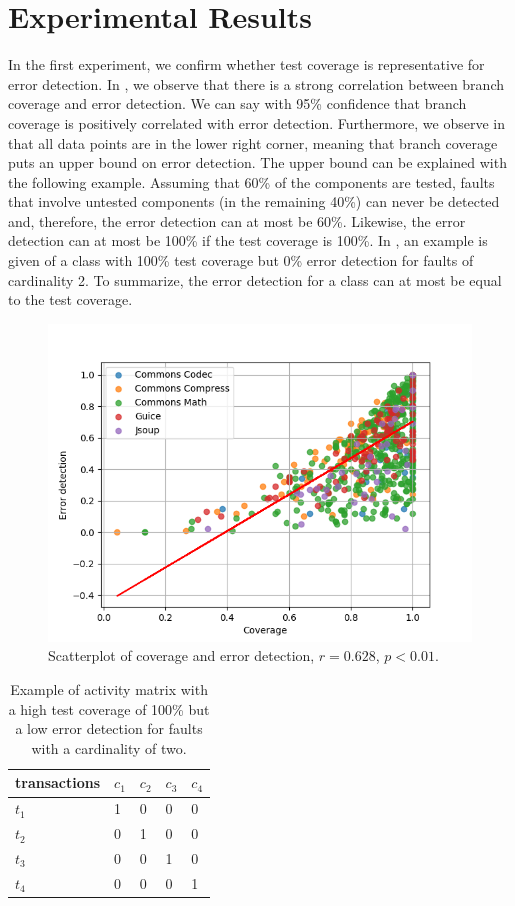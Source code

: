 \documentclass[twoside,a4paper,11pt]{memoir}
\begin{document}
\section{Experimental Results}
In the first experiment, we confirm whether test coverage is representative for error detection.
In , we observe that there is a strong correlation between branch coverage and error detection.
We can say with 95\% confidence that branch coverage is positively correlated with error detection.
Furthermore, we observe in  that all data points are in the lower right corner, meaning that branch coverage puts an upper bound on error detection.
The upper bound can be explained with the following example.
Assuming that 60\% of the components are tested, faults that involve untested components (in the remaining 40\%) can never be detected and, therefore, the error detection can at most be 60\%.
Likewise, the error detection can at most be 100\% if the test coverage is 100\%.
In , an example is given of a class with 100\% test coverage but 0\% error detection for faults of cardinality 2.
To summarize, the error detection for a class can at most be equal to the test coverage.
\begin{figure}
  \includegraphics[width=\linewidth]{figures/coverage_error_detection}
  \caption{Scatterplot of coverage and error detection, \(r = 0.628 \), \(p < 0.01 \).}%
  \label{fig:coverage_error_detection}
\end{figure}

\begin{table}[]
    \centering
    \caption{Example of activity matrix with a high test coverage of 100\% but a low error detection for faults with a cardinality of two.}%
    \label{tab:hightclowed}
    \begin{tabular}{l|llll}
    transactions & \(c_1 \) & \(c_2 \) & \(c_3 \) & \(c_4 \) \\ \hline
    \(t_1 \) & 1 & 0 & 0 & 0 \\
    \(t_2 \) & 0 & 1 & 0 & 0 \\
    \(t_3 \) & 0 & 0 & 1 & 0 \\
    \(t_4 \) & 0 & 0 & 0 & 1
    \end{tabular}
\end{table}
\end{document}
